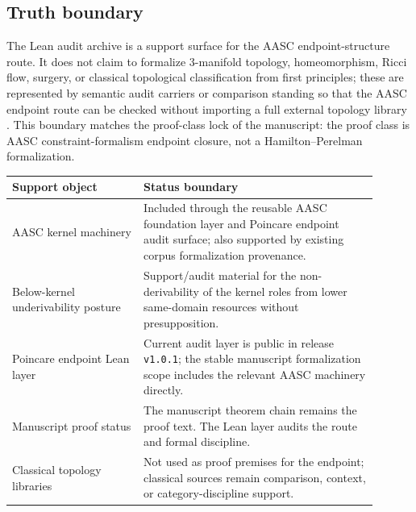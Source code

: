 \documentclass[11pt]{article}
\begin{document}
\subsection*{Truth boundary}
{}

The Lean audit archive is a support surface for the AASC endpoint-structure route. It does not claim to formalize 3-manifold topology, homeomorphism, Ricci flow, surgery, or classical topological classification from first principles; these are represented by semantic audit carriers or comparison standing so that the AASC endpoint route can be checked without importing a full external topology library \cite{PoincareLeanAuditGithub2026,PoincareLeanAuditRelease2026}. This boundary matches the proof-class lock of the manuscript: the proof class is AASC constraint-formalism endpoint closure, not a Hamilton--Perelman formalization.

\begin{longtable}{L{0.32\linewidth}L{0.58\linewidth}}
\toprule
\textbf{Support object} & \textbf{Status boundary}\\
\midrule
AASC kernel machinery & Included through the reusable AASC foundation layer and Poincare endpoint audit surface; also supported by existing corpus formalization provenance.\\
Below-kernel underivability posture & Support/audit material for the non-derivability of the kernel roles from lower same-domain resources without presupposition.\\
Poincare endpoint Lean layer & Current audit layer is public in release \texttt{v1.0.1}; the stable manuscript formalization scope includes the relevant AASC machinery directly.\\
Manuscript proof status & The manuscript theorem chain remains the proof text. The Lean layer audits the route and formal discipline.\\
Classical topology libraries & Not used as proof premises for the endpoint; classical sources remain comparison, context, or category-discipline support.\\
\bottomrule
\end{longtable}
\end{document}
